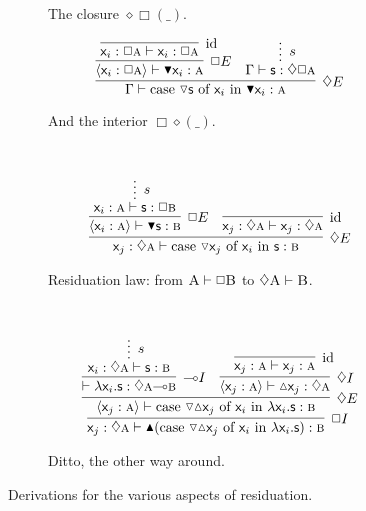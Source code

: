 \begin{figure}
\begin{subfigure}{0.4\textwidth}
\[{{			}
		}
		\]
		\caption{The closure $\diamond\Box(\_)$.}
		\label{subfigure:modal_properties:closure}
	\end{subfigure}%
	\begin{subfigure}{0.5\textwidth}
		\[
		\infer[\diamond E]{\Gamma \vdash \cterm{case \term{\diaelim{s}} of \term{\vari } in \term{\boxelim \vari }}: \prop{a}}{
						\infer[\Box E]{\bracket{\term{\vari }: \Box \prop{a}}\vdash \boxelim\term{\vari }:\prop{a}}{
							\infer[\Ax]{\term{\vari }: \Box\prop{a} \vdash \term{\vari }: \Box\prop{a}}{}
						}
						&
						\infer*[s]{\Gamma\vdash \term{s}: \diamond \Box \prop{a}}{}
				}
		\]
		\caption{And the interior $\Box\diamond(\_)$.}
		\label{subfigure:modal_properties:interior}
	\end{subfigure}\\[\midsep]
	\begin{subfigure}{1\textwidth}
		\[
			\infer[\diamond E]{\term{\varj}: \diamond \prop{a} \vdash \caseof{\diaelim \varj}{\vari }{s}:\prop{b}}{
				\infer[\Box E]{\bracket{\term{\vari }: \prop{a}} \vdash \boxelim\term{s}: \prop{b}}{
					\infer*[s]{\term{\vari }: \prop{a} \vdash \term{s}: \Box\prop{b}}{}
				}
				&
				\infer[\Ax]{\term{\varj}: \diamond \prop{a} \vdash \term{\varj}: \diamond \prop{a}}{}
			}
		\]
	\caption{Residuation law: from $\smallprop{A} \vdash \Box\smallprop{B}$ to $\diamond\smallprop{A} \vdash \smallprop{B}$.}
	\label{subfigure:modal_properties:residuation:1}	
	\end{subfigure}\\[\midsep]
	\begin{subfigure}{1\textwidth}
		\[
			\infer[\Box I]{\term{\varj}: \diamond \prop{a} \vdash \boxintro(\caseof{\diaelim \diaintro \varj}{\vari }{\lam \vari .s}): \prop{b}}{
				\infer[\diamond E]{\bracket{\term{\varj}: \prop{a}} \vdash \caseof{\diaelim \diaintro \varj}{\vari }{\lam \vari .s}: \prop{b}}{
					\infer[\li I]{\vdash \term{\lam \vari .s}: \diamond\prop{a} \li \prop{b}}{
						\infer*[s]{\term{\vari }: \diamond\prop{a} \vdash \term{s}: \prop{b}}{}
					}
					&
					\infer[\diamond I]{\bracket{\term{\varj}: \prop{a}} \vdash \term{\diaintro \varj}: \diamond \prop{a}}{
						\infer[\Ax]{\term{\varj}: \prop{a} \vdash \term{\varj}: \prop{a}}{}
					}
				}
			}
		\]
		\caption{Ditto, the other way around.}
		\label{subfigure:modal_properties:residuation:2}	
	\end{subfigure}
	\caption{Derivations for the various aspects of residuation.}
	\label{figure:modal_properties:residuation}
\end{figure}

